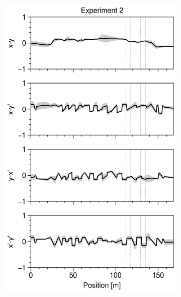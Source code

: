 \begin{figure}[!p]
\begin{subfigure}{0.32\textwidth}
    \end{subfigure}
    \hfill
    \begin{subfigure}{0.32\textwidth}
        \includegraphics[width=\textwidth]{Images/chapter5/exp2/compare_corr.png}
    \end{subfigure}
    \hfill
    \begin{subfigure}{0.32\textwidth}

\end{subfigure}
\end{figure}
